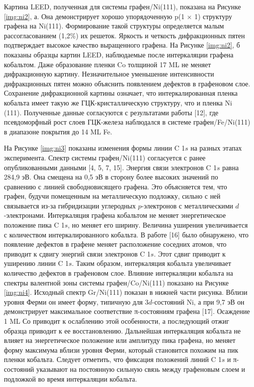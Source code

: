 Картина LEED, полученная для системы графен/Ni(111), показана на Рисунке \ref{img:ni2}, а. Она демонстрирует хорошо упорядоченную p(1 × 1) структуру графена на Ni(111). Формирование такой структуры определяется малым рассогласованием (1,2\%) их решеток. Яркость и четкость дифракционных пятен подтверждает высокое качество выращенного графена. На Рисунке \ref{img:ni2}, б показаны образцы картин LEED, наблюдаемые после интеркаляции графена кобальтом. Даже образование пленки Co толщиной 17 ML не меняет дифракционную картину. Незначительное уменьшение интенсивности дифракционных пятен можно объяснить появлением дефектов в графеновом слое. Сохранение дифракционной картины означает, что интеркалированная пленка кобальта имеет такую же ГЦК-кристаллическую структуру, что и пленка Ni (111). Полученные данные согласуются с результатами работы [12], где псевдоморфный рост слоев ГЦК-железа наблюдался в системе графен/Fe/Ni(111) в диапазоне покрытия до 14 ML Fe. 

На Рисунке \ref{img:ni3} показаны изменения формы линии C 1$s$ на разных этапах эксперимента. Спектр системы графен/Ni(111) согласуется с ранее опубликованными данными [4, 5, 7, 15]. Энергия связи электронов C 1$s$ равна 284,9 эВ. Она смещена на 0,5 эВ в сторону более высоких значений по сравнению с линией свободновисящего графена. Это объясняется тем, что графен, будучи помещенным на металлическую подложку, сильно с ней связывается из-за гибридизации углеродных $p$-электронов с металлическими $d$-электронами. Интеркаляция графена кобальтом не меняет энергетическое положение пика C 1$s$, но меняет его ширину. Величина уширения увеличивается с количеством интеркалированного кобальта. В работе [16] было обнаружено, что появление дефектов в графене меняет расположение соседних атомов, что приводит к сдвигу энергий связи электронов C 1$s$. Этот сдвиг приводит к уширению линии C 1$s$. Таким образом, интеркаляция кобальта увеличивает количество дефектов в графеновом слое. 
Влияние интеркаляции кобальта на спектры валентной зоны системы графен/Co/Ni(111) показано на Рисунке \ref{img:ni4}. Исходный спектр Gr/Ni(111) показан в нижней части рисунка. Вблизи уровня Ферми он имеет форму, типичную для 3$d$-состояний Ni, а при 9,7 эВ он демонстрирует максимальное соответствие π-состояниям графена [17]. Осаждение 1 ML Со приводит к ослаблению этой особенности, а последующий отжиг образца приводит к ее восстановлению. Дальнейшая интеркаляция кобальта не влияет на энергетическое положение или амплитуду пика графена, но меняет форму максимума вблизи уровня Ферми, который становится похожим на пик пленки кобальта. Следует отметить, что фиксация положений линий C 1$s$ и π-состояний указывают на постоянную сильную связь между графеновым слоем и подложкой во время интеркаляции кобальта. 

